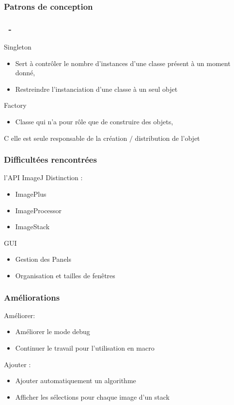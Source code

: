 \documentclass[11pt]{beamer}
\begin{document}
\subsubsection*{Patrons de conception}
\begin{frame}
\frametitle{\subsecname ~- \subsubsecname}
	\begin{block}{Singleton}
		\begin{itemize}
			\item Sert à contrôler le nombre d'instances d'une classe présent à un moment donné,
			\item Restreindre l'instanciation d'une classe à un seul objet
		\end{itemize}
	\end{block}
	\begin{block}{Factory}
		\begin{itemize}
			\item Classe qui n'a pour rôle que de construire des objets,
		\end{itemize}
		C elle est seule responsable de la création $/$ distribution de l’objet
	\end{block}
\end{frame}
\begin{frame}
\frametitle{Difficultées rencontrées}
	\begin{block}{l'API ImageJ}
	Distinction :
		\begin{itemize}
			\item ImagePlus
			\item ImageProcessor
			\item ImageStack
		\end{itemize}
	\end{block}
	\begin{block}{GUI}
		\begin{itemize}
			\item Gestion des Panels
			\item Organisation et tailles de fenêtres
		\end{itemize}
	\end{block}
\end{frame}
\begin{frame}
\frametitle{Améliorations}
	\begin{block}{Améliorer:}
		\begin{itemize}
			\item Améliorer le mode debug
			\item Continuer le travail pour l'utilisation en macro
		\end{itemize}
	\end{block}
	\begin{block}{Ajouter :}
		\begin{itemize}
			\item Ajouter automatiquement un algorithme
			\item Afficher les sélections pour chaque image d'un stack
		\end{itemize}
	\end{block}
\end{frame}
\end{document}
